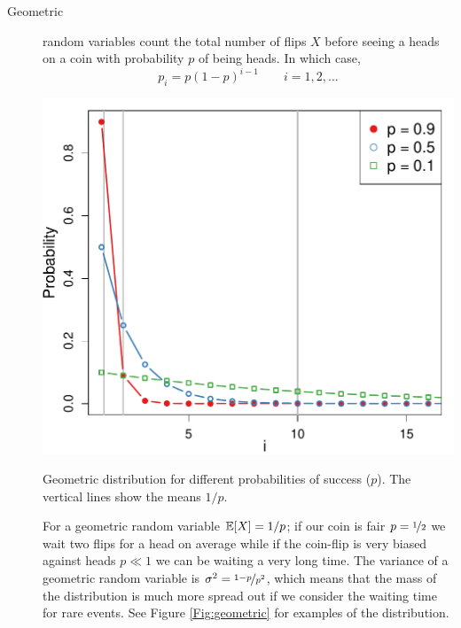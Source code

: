 \begin{description}
\item[Geometric] random variables count the total number of flips $X$ before seeing a heads on a coin with probability $p$ of being heads. In which case, 
\begin{equation}
p_i =p (1-p)^{i-1} \qquad i=1,2,\dots \label{eqn:geometric_def}
\end{equation}
    \begin{marginfigure}
 \begin{center}
   \includegraphics[width=\textwidth]{math_background/dist_pics/Geometric.pdf}\end{center}
 \caption{Geometric distribution for different probabilities of
   success ($p$). The vertical lines show the means $1/p$. }\label{Fig:geometric}
 \end{marginfigure}
For a geometric random variable $\mathbb{E}[X]=1/p$; if our coin is fair
$p=\nicefrac{1}{2}$ we wait two flips for a head on average while if
the coin-flip is very biased against heads $p \ll 1$ we can be waiting
a very long time. The variance of a
geometric random variable is $\sigma^2 =\nicefrac{1-p}{p^2}$, which
means that the mass of the distribution is much more spread out if we
consider the waiting time for rare events. See Figure
\ref{Fig:geometric} for examples of the distribution. 


\end{description}
